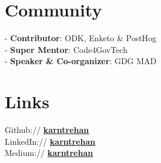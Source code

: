 \documentclass[]{deedy-resume-reversed}
\begin{document}
\begin{minipage}[t]{0.33\textwidth}
\section{Community}
- {\bf Contributor}: ODK, Enketo \& PostHog \\
- {\bf Super Mentor}: Code4GovTech \\
- {\bf Speaker \& Co-organizer}: GDG MAD
\sectionsep


\section{Links}
Github:// \href{https://github.com/karntrehan}{\bf karntrehan} \\
LinkedIn://  \href{https://www.linkedin.com/in/karntrehan}{\bf karntrehan} \\
Medium://  \href{https://medium.com/@karntrehan}{\bf karntrehan}
\sectionsep

\end{minipage}
\end{document}
